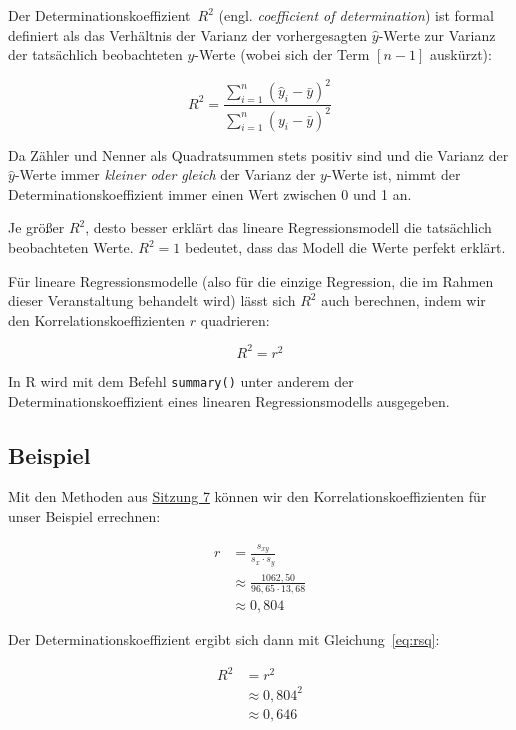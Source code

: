 \documentclass[
  11pt,
  ngerman,
  a4paper,
]{report}
\newenvironment{rtip}{
  \medskip
  \begin{tcolorbox}[colframe=purple,colback=light_gray,title=Softwarehinweis]
}{
  \end{tcolorbox}
  \medskip
}
\begin{document}
Der Determinationskoeffizient~\(R^2\) (engl. \emph{coefficient of determination}) ist formal definiert als das Verhältnis der Varianz der vorhergesagten \(\hat{y}\)-Werte zur Varianz der tatsächlich beobachteten \(y\)-Werte (wobei sich der Term \([n-1]\) auskürzt):

\[
R^2=\frac{\sum\limits^n_{i=1}(\hat{y}_i-\bar{y})^2}{\sum\limits^n_{i=1}(y_i-\bar{y})^2}
\label{eq:rsqformal}
\]

Da Zähler und Nenner als Quadratsummen stets positiv sind und die Varianz der \(\hat{y}\)-Werte immer \emph{kleiner oder gleich} der Varianz der \(y\)-Werte ist, nimmt der Determinationskoeffizient immer einen Wert zwischen 0 und 1 an.

Je größer \(R^2\), desto besser erklärt das lineare Regressionsmodell die tatsächlich beobachteten Werte. \(R^2=1\) bedeutet, dass das Modell die Werte perfekt erklärt.

Für lineare Regressionsmodelle (also für die einzige Regression, die im Rahmen dieser Veranstaltung behandelt wird) lässt sich \(R^2\) auch berechnen, indem wir den Korrelationskoeffizienten \(r\) quadrieren:

\[
R^2=r^2
\label{eq:rsq}
\]

\begin{rtip}
In R wird mit dem Befehl \verb|summary()| unter anderem der Determinationskoeffizient eines linearen Regressionsmodells ausgegeben.
\end{rtip}

\hypertarget{beispiel-28}{%
\subsection{Beispiel}\label{beispiel-28}}

Mit den Methoden aus \protect\hyperlink{korrelationskoeffizient}{Sitzung 7} können wir den Korrelationskoeffizienten für unser Beispiel errechnen:

\[
\begin{aligned}
r&=\frac{s_{xy}}{s_x\cdot s_y}\\
&\approx\frac{1062{,}50}{96{,}65\cdot13,68}\\
&\approx0{,}804
\end{aligned}
\]

Der Determinationskoeffizient ergibt sich dann mit Gleichung~\eqref{eq:rsq}:

\[
\begin{aligned}
R^2&=r^2\\
&\approx 0{,}804^2\\
&\approx 0{,}646
\end{aligned}
\]
\end{document}
